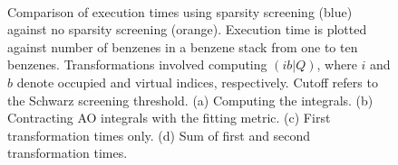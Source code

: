\begin{figure}[H]
  \centering
  \hfill
  \hfill \\
  \hfill
  \caption{Comparison of execution times using sparsity screening (blue) against no sparsity screening (orange). Execution time is plotted against number of benzenes
 in a benzene stack from one to ten benzenes. Transformations involved computing $(ib|Q)$, where $i$ and $b$ denote occupied and virtual indices, respectively.
 Cutoff refers to the Schwarz screening threshold. (a) Computing the integrals. (b) Contracting AO integrals with the fitting metric. 
(c) First transformation times only. (d) Sum of first and second transformation times.}
\end{figure}

